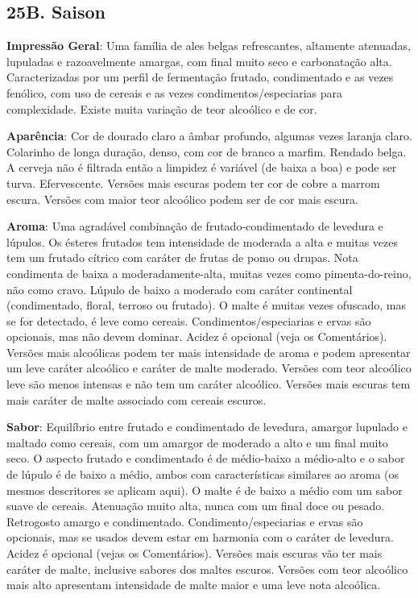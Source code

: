 \subsection*{25B. Saison}
\textbf{Impressão Geral}: Uma família de ales belgas refrescantes, altamente atenuadas, lupuladas e razoavelmente amargas, com final muito seco e carbonatação alta. Caracterizadas por um perfil de fermentação frutado, condimentado e as vezes fenólico, com uso de cereais e as vezes condimentos/especiarias para complexidade. Existe muita variação de teor alcoólico e de cor.

\textbf{Aparência}: Cor de dourado claro a âmbar profundo, algumas vezes laranja claro. Colarinho de longa duração, denso, com cor de branco a marfim. Rendado belga. A cerveja não é filtrada então a limpidez é variável (de baixa a boa) e pode ser turva. Efervescente.
Versões mais escuras podem ter cor de cobre a marrom escura. Versões com maior teor alcoólico podem ser de cor mais escura.

\textbf{Aroma}: Uma agradável combinação de frutado-condimentado de levedura e lúpulos. Os ésteres frutados tem intensidade de moderada a alta e muitas vezes tem um frutado cítrico com caráter de frutas de pomo ou drupas. Nota condimenta de baixa a moderadamente-alta, muitas vezes como pimenta-do-reino, não como cravo. Lúpulo de baixo a moderado com caráter continental (condimentado, floral, terroso ou frutado). O malte é muitas vezes ofuscado, mas se for detectado, é leve como cereais. Condimentos/especiarias e ervas são opcionais, mas não devem dominar. Acidez é opcional (veja os Comentários).
Versões mais alcoólicas podem ter mais intensidade de aroma e podem apresentar um leve caráter alcoólico e caráter de malte moderado. Versões com teor alcoólico leve são menos intensas e não tem um caráter alcoólico. Versões mais escuras tem mais caráter de malte associado com cereais escuros.

\textbf{Sabor}: Equilíbrio entre frutado e condimentado de levedura, amargor lupulado e maltado como cereais, com um amargor de moderado a alto e um final muito seco. O aspecto frutado e condimentado é de médio-baixo a médio-alto e o sabor de lúpulo é de baixo a médio, ambos com características similares ao aroma (os mesmos descritores se aplicam aqui). O malte é de baixo a médio com um sabor suave de cereais. Atenuação muito alta, nunca com um final doce ou pesado. Retrogosto amargo e condimentado. Condimento/especiarias e ervas são opcionais, mas se usados devem estar em harmonia com o caráter de levedura. Acidez é opcional (vejas os Comentários).
Versões mais escuras vão ter mais caráter de malte, inclusive sabores dos maltes escuros. Versões com teor alcoólico mais alto apresentam intensidade de malte maior e uma leve nota alcoólica.


